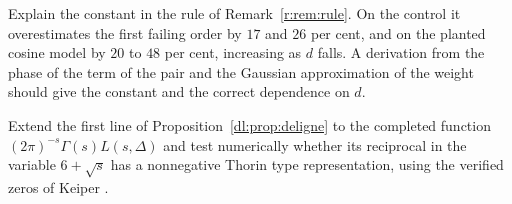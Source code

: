 \begin{openproblem}
Explain the constant in the rule of Remark~\ref{r:rem:rule}. On the control it overestimates the first failing order by $17$ and $26$ per cent, and on the planted cosine model by $20$ to $48$ per cent, increasing as $d$ falls. A derivation from the phase of the term of the pair and the Gaussian approximation of the weight should give the constant and the correct dependence on $d$.
\end{openproblem}

\begin{openproblem}
Extend the first line of Proposition~\ref{dl:prop:deligne} to the completed function $(2\pi)^{-s}\Gamma(s)L(s,\Delta)$ and test numerically whether its reciprocal in the variable $6+\sqrt s$ has a nonnegative Thorin type representation, using the verified zeros of Keiper \cite{Keiper96}.
\end{openproblem}
